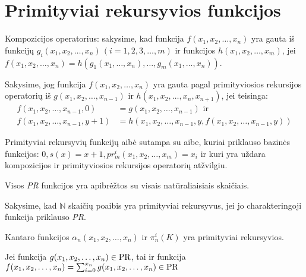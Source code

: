 \chapter{Primityviai rekursyvios funkcijos}

Kompozicijos operatorius: sakysime, kad funkcija
$f(x_1,x_2,\dotsc,x_n)$ yra gauta iš funkcijų 
$g_{i}(x_1,x_2,\dotsc,x_n)\,(i=1,2,3,\dotsc,m)$ ir funkcijos
$h(x_1,x_2,\dotsc,x_m)$, jei 
$f(x_1,x_2,\dotsc,x_n) = %
h(g_{1}(x_1,\dotsc,x_n),\dotsc,g_{m}(x_1,\dotsc,x_n))$.

\begin{defn}
  Sakysime, jog funkcija $f(x_1,x_2,\dotsc,x_n)$ yra gauta pagal 
  primityviosios rekursijos operatorių iš 
  $g(x_1,x_2,\dotsc,x_{n-1})$ ir 
  $h(x_1,x_2,\dotsc,x_n,x_{n+1})$, jei teisinga:
  \begin{align*}
    f(x_1,x_2,\dotsc,x_{n-1},0) &= g(x_1,x_2,\dotsc,x_{n-1}) \text{ ir} \\
    f(x_1,x_2,\dotsc,x_{n-1},y+1) &= %
      h(x_1,x_2,\dotsc,x_{n-1},y,f(x_1,x_2,\dotsc,x_{n-1},y))
  \end{align*}
\end{defn}

\begin{defn}
  Primityviai rekursyvių funkcijų aibė sutampa su aibe, kuriai
  priklauso bazinės funkcijos: 
  $0, s(x) = x+1, pr_{m}^{i}(x_1,x_2,\dotsc,x_m) = x_{i}$ ir
  kuri yra uždara kompozicijos ir primityviosios rekursijos
  operatorių atžvilgiu.
\end{defn}

Visos \emph{PR} funkcijos yra apibrėžtos su visais natūraliaisiais 
skaičiais.

Sakysime, kad $\mathbb{N}$ skaičių poaibis yra primityviai rekursyvus,
jei jo charakteringoji funkcija priklauso \emph{PR}.

\begin{prop}
  Kantaro funkcijos $\alpha_{n}(x_1,x_2,\dotsc,x_n)$ ir 
  $\pi^{i}_{n}(K)$ yra primityviai rekursyvios.
\end{prop}

\begin{prop}
  Jei funkcija $g(x_1,x_2,\dotsc,x_n) \in \mathop{\text{PR}}$, tai ir 
  funkcija
  $f(x_1,x_2,\dotsc,x_n) = \sum _{i=0} ^{x_n} g(x_1,x_2,\dotsc,x_n)%
  \in \PR$
\end{prop}

